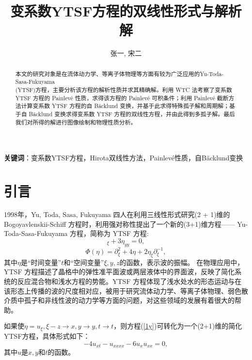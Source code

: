 \documentclass[11pt,a4paper]{ctexart}
\begin{document}
\title{变系数YTSF方程的双线性形式与解析解}
\author{张一, 宋二}
\maketitle

\begin{abstract}
    本文的研究对象是在流体动力学、等离子体物理等方面有较为广泛应用的Yu-Toda-Sasa-Fukuyama\\
    (YTSF)方程，主要分析该方程的解析性质并求其精确解。利用 WTC 法考察了变系数 YTSF 方程的 Painlev\'{e} 性质，求得该方程的 Painlev\'{e} 可积条件；利用 Painlev\'{e} 截断方法计算变系数 YTSF 方程的自 B\"{a}cklund 变换，并基于此求得特殊孤子解和周期解；基于自 B\"{a}cklund 变换求得变系数 YTSF 方程的双线性方程，并由此得到多孤子解。最后我们对所得的解进行图像绘制和物理性质分析。
\end{abstract}

\textbf{关键词}：变系数YTSF方程，Hirota双线性方法，Painlev\'{e}性质，自B\"{a}cklund变换

\section{引言}

1998年，Yu, Toda, Sasa, Fukuyama 四人在利用三线性形式研究(2 + 1)维的 Bogoyavlenskii-Schiff 方程时，利用强对称性提出了一个新的(3+1)维方程—— Yu-Toda-Sasa-Fukuyama 方程，简称为 YTSF 方程\cite{1,2,3}:
\begin{equation}
    [\Phi(\eta)\eta_z-4\eta_t]_{\xi}+3\eta_{yy}=0,\label{1y}
\end{equation}
\begin{equation}
    \Phi(\eta)=\partial_{\xi}^2+4\eta+2\eta_{\xi}\partial_{\xi}^{-1},
\end{equation}
其中$\eta$是“时间变量”$t$和“空间变量”$\xi,y,z$的函数，表示波的振幅\cite{4,5}。
在物理应用中，YTSF 方程描述了晶格中的弹性准平面波或两层液体中的界面波，反映了简化系统的反应混合物和浅水方程的势能。YTSF 方程体现了浅水处水的形态运动与在该形态上传播的波的尺度相对应，被用于研究流体动力学、等离子体物理、弱色散介质中孤子和非线性波的动力学等方面的问题，对这些领域的发展有着很大的帮助\cite{6}。

如果使$\eta=u_{\xi},\xi-z \rightarrow x,y \rightarrow y,t\rightarrow t$，则方程(\ref{1y})可转化为一个(2+1)维的简化YTSF方程，具体形式如下：
\begin{equation}
    -4u_{xt}-u_{xxxx}-6u_xu_{xx}=0,\label{2y}
\end{equation}
其中$u$是$x,y$和$t$的函数。
\end{document}
